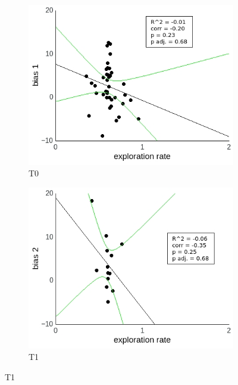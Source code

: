 \documentclass[a4paper]{scrreprt}
\begin{document}
\begin{figure}
\centering
\begin{subfigure}[b]{0.49\textwidth}
        \includegraphics[width=\textwidth]{figs/sec3/temp/tempno_diff_1_mod1dat.jpeg}
        \caption{T0}
    \end{subfigure}
    \begin{subfigure}[b]{0.49\textwidth}
        \includegraphics[width=\textwidth]{figs/sec3/temp/tempno_diff_2_mod1dat.jpeg}
        \caption{T1}
    \end{subfigure}


\end{figure}
\end{document}
